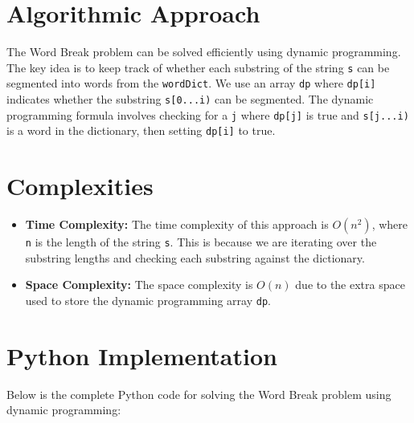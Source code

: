 \section*{Algorithmic Approach}

The Word Break problem can be solved efficiently using dynamic programming. The key idea is to keep track of whether each substring of the string \texttt{s} can be segmented into words from the \texttt{wordDict}. We use an array \texttt{dp} where \texttt{dp[i]} indicates whether the substring \texttt{s[0...i)} can be segmented. The dynamic programming formula involves checking for a \texttt{j} where \texttt{dp[j]} is true and \texttt{s[j...i)} is a word in the dictionary, then setting \texttt{dp[i]} to true.


\section*{Complexities}

\begin{itemize}
    \item \textbf{Time Complexity:} The time complexity of this approach is \(O(n^2)\), where \texttt{n} is the length of the string \texttt{s}. This is because we are iterating over the substring lengths and checking each substring against the dictionary.
    \item \textbf{Space Complexity:} The space complexity is \(O(n)\) due to the extra space used to store the dynamic programming array \texttt{dp}.
\end{itemize}

\section*{Python Implementation}


Below is the complete Python code for solving the Word Break problem using dynamic programming:

